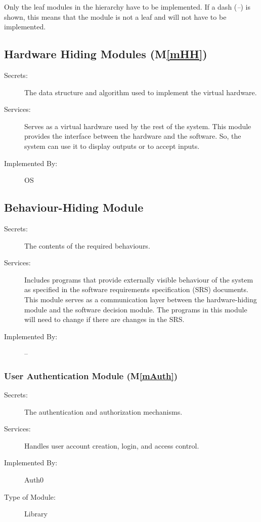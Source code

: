 \documentclass[12pt, titlepage]{article}
\newcommand{\mref}[1]{M\ref{#1}}
\begin{document}
Only the leaf modules in the hierarchy have to be implemented. If a dash
(\emph{--}) is shown, this means that the module is not a leaf and will not have
to be implemented.

\subsection{Hardware Hiding Modules (\mref{mHH})}

\begin{description}
\item[Secrets:] The data structure and algorithm used to implement the virtual
  hardware.
\item[Services:] Serves as a virtual hardware used by the rest of the
  system. This module provides the interface between the hardware and the
  software. So, the system can use it to display outputs or to accept inputs.
\item[Implemented By:] OS
\end{description}

\subsection{Behaviour-Hiding Module}

\begin{description}
\item[Secrets:] The contents of the required behaviours.
\item[Services:] Includes programs that provide externally visible behaviour of
  the system as specified in the software requirements specification (SRS)
  documents. This module serves as a communication layer between the
  hardware-hiding module and the software decision module. The programs in this
  module will need to change if there are changes in the SRS.
\item[Implemented By:] --
\end{description}

\subsubsection{User Authentication Module (\mref{mAuth})}

\begin{description}
\item[Secrets:] The authentication and authorization mechanisms.
\item[Services:] Handles user account creation, login, and access control.
\item[Implemented By:] Auth0
\item[Type of Module:] Library
\end{description}
\end{document}
